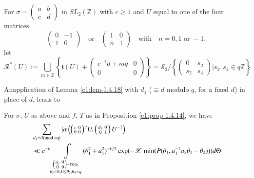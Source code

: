 For $\sigma=\left(\begin{smallmatrix} a & b\\ c & d
\end{smallmatrix}\right)$ in $SL_{2}(\mathbb{Z})$ with $c\geq 1$ and
$U$ equal to one of the four matrices
$$
\begin{pmatrix}
0 & -1\\
1 & 0
\end{pmatrix}
\quad\text{or}\quad
\begin{pmatrix}
1 & 0\\
n & 1
\end{pmatrix}
\quad\text{with}\quad
n=0, 1\text{ \ or \ }-1,
$$
let
$$
\mathscr{R}^{\ast}(U):=\bigcup_{m\in\mathbb{Z}}\left\{\mathfrak{t}(U)+
\begin{pmatrix}
c^{-1}d+mq & 0\\ 
0 & 0
\end{pmatrix}\right\}=\mathscr{S}_{2}/
\left\{
\begin{pmatrix}
0 & s_{2}\\
s_{2} & s_{4}
\end{pmatrix}|s_{2},s_{4}\in q\mathbb{Z}\right\}
$$

An\pageoriginale application of Lemma \ref{c1:lem-1.4.18} with $d_{1}$
($\equiv d$ modulo $q$, for a fixed $d$) in place of $d$, leads to

\begin{sublemma}\label{c1:lem-1.4.19}
For $\sigma$, $U$ as above and $f$, $T$ as in Proposition
\ref{c1:prop-1.4.14}, we have 
\begin{align*}
& \sum\limits_{d_{1}\equiv d(\rm{mod} \; cq)}|\alpha
\left(\left(\begin{smallmatrix} c & 0\\ 0 & 0
\end{smallmatrix}\right){}^{t}U,\left(\begin{smallmatrix} d_{1} &
  0\\ 0 & 1
\end{smallmatrix}\right)U^{-1}\right)|\\
& \ll c^{-k}\int\limits_{\substack{\left(\begin{smallmatrix} a_{c} & 0\\ 0 &
      0
    \end{smallmatrix}\right)+\tau
    \in\mathfrak{g}_{2}\\ \theta_{1}\in\mathbb{R}, 0\leq
    \theta_{2},\theta_{4}<q}}
(\theta^{2}_{1}+a^{2}_{1})^{-k/2}\exp(-\mathscr{X}\min
(P(\theta_{1},a^{-1}_{1}a_{2}\theta_{1}-\theta_{2})))d\Theta 
\end{align*}
\end{sublemma}

